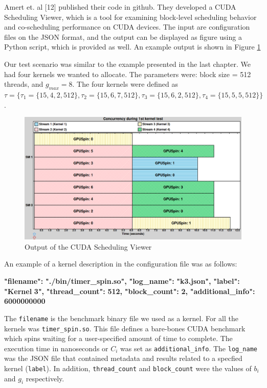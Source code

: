 \documentclass[
  12pt,
  a4paperpaper,
]{report}
\newenvironment{Shaded}{}{}
\newcommand{\ErrorTok}[1]{\textcolor[rgb]{1.00,0.00,0.00}{\textbf{#1}}}
\begin{document}
Amert et. al {[}12{]} published their code in github. They developed a
CUDA Scheduling Viewer, which is a tool for examining block-level
scheduling behavior and co-scheduling performance on CUDA devices. The
input are configuration files on the JSON format, and the output can be
displayed as figure using a Python script, which is provided as well. An
example output is shown in Figure \ref{img:nvidia-base}

Our test scenario was similar to the example presented in the last
chapter. We had four kernels we wanted to allocate. The parameters were:
block size = 512 threads, and \(g_{max} = 8\). The four kernels were
defined as
\(\tau = \{\tau_1 = \{15, 4, 2, 512\} , \tau_2 = \{15, 6,7,512\}, \tau_3 = \{15, 6,2,512\}, \tau_4 =\{ 15, 5,5,512\} \}\).

\begin{figure}
\centering
\includegraphics{source/figures/nvidia/base.png}
\caption{Output of the CUDA Scheduling Viewer \label{img:nvidia-base}}
\end{figure}

An example of a kernel description in the configuration file was as
follows:

\begin{Shaded}
\begin{Highlighting}[]
      \ErrorTok{"filename":} \ErrorTok{"./bin/timer\_spin.so",}
      \ErrorTok{"log\_name":} \ErrorTok{"k3.json",}
      \ErrorTok{"label":} \ErrorTok{"Kernel} \ErrorTok{3",}
      \ErrorTok{"thread\_count":} \ErrorTok{512,}
      \ErrorTok{"block\_count":} \ErrorTok{2,}
      \ErrorTok{"additional\_info":} \ErrorTok{6000000000}
\end{Highlighting}
\end{Shaded}

The \texttt{filename} is the benchmark binary file we used as a kernel.
For all the kernels was \texttt{timer\_spin.so}. This file defines a
bare-bones CUDA benchmark which spins waiting for a user-specified
amount of time to complete. The execution time in nanoseconds or \(C_i\)
was set as \texttt{additional\_info}. The \texttt{log\_name} was the
JSON file that contained metadata and results related to a specfied
kernel (\texttt{label}). In addition, \texttt{thread\_count} and
\texttt{block\_count} were the values of \(b_i\) and \(g_i\)
respectively.
\end{document}
